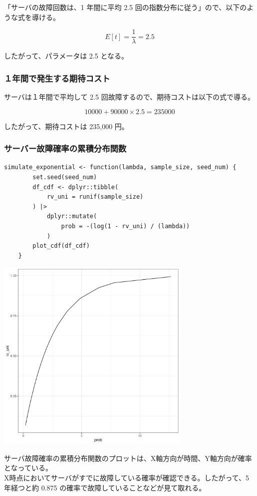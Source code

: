 \documentclass{article}
\begin{document}
「サーバの故障回数は、1 年間に平均 2.5 回の指数分布に従う」ので、以下のような式を導ける。

\[ E[t] = \frac{1}{\lambda} = 2.5 \]

したがって、パラメータ\lambda は 2.5 となる。

\subsubsection{１年間で発生する期待コスト}

サーバは１年間で平均して 2.5 回故障するので、期待コストは以下の式で導る。

\[ 10000 + 90000 \times 2.5 = 235000 \]

したがって、期待コストは 235,000 円。

\subsubsection{サーバー故障確率の累積分布関数}

\begin{lstlisting}[]
	simulate_exponential <- function(lambda, sample_size, seed_num) {
		set.seed(seed_num)
		df_cdf <- dplyr::tibble(
			rv_uni = runif(sample_size)
		) |>
			dplyr::mutate(
				prob = -(log(1 - rv_uni) / (lambda))
			)
		plot_cdf(df_cdf)
	}

\end{lstlisting}
	\begin{center}
		\includegraphics[width=0.7\textwidth]{2-3_plot.png}
	\end{center}

サーバ故障確率の累積分布関数のプロットは、X軸方向が時間、Y軸方向が確率となっている。\\
X時点においてサーバがすでに故障している確率が確認できる。したがって、5年経つと約 0.875 の確率で故障していることなどが見て取れる。
\end{document}
